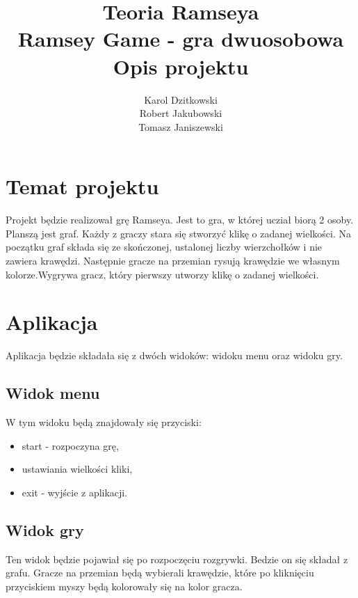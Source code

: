 \documentclass[11pt,a4paper]{article}
\author{
	Karol Dzitkowski\\
	Robert Jakubowski\\
	Tomasz Janiszewski
}
\title{
	Teoria Ramseya\\
	\huge{Ramsey Game - gra dwuosobowa}\\
	Opis projektu
 }
\begin{document}
\maketitle
\newpage

\tableofcontents
\newpage

\section{Temat projektu}
Projekt będzie realizował grę Ramseya. Jest to gra, w której ucział biorą 2 osoby. Planszą jest graf. Każdy z graczy stara się stworzyć klikę o zadanej wielkości. Na początku graf składa się ze skończonej, ustalonej liczby wierzchołków i nie zawiera krawędzi. Następnie gracze na przemian rysują krawędzie we własnym kolorze.Wygrywa gracz, który pierwszy utworzy klikę o zadanej wielkości.

\section{Aplikacja}
Aplikacja będzie składała się z dwóch widoków: widoku menu oraz widoku gry.

\subsection{Widok menu}
W tym widoku będą znajdowały się przyciski:

\begin{itemize}
	\item start - rozpoczyna grę,
	\item ustawiania wielkości kliki,
	\item exit - wyjście z aplikacji.
\end{itemize}


\subsection{Widok gry}
Ten widok będzie pojawiał się po rozpoczęciu rozgrywki. Bedzie on się składał z grafu. Gracze na przemian będą wybierali krawędzie, które po kliknięciu przyciskiem myszy będą kolorowały się na kolor gracza.
\end{document}
